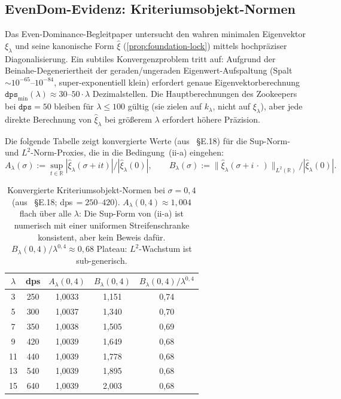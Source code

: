 \documentclass[12pt,a4paper]{article}
\theoremstyle{definition}
\theoremstyle{remark}
\begin{document}
\subsection{EvenDom-Evidenz: Kriteriumsobjekt-Normen}
\label{subsec:evendom-empirics}

Das Even-Dominance-Begleitpaper \cite{Geiger2026evendom} untersucht den
wahren minimalen Eigenvektor $\xi_\lambda$ und seine kanonische Form
$\hat{\xi}$ (\cref{prop:foundation-lock}) mittels hochpräziser
Diagonalisierung. Ein subtiles Konvergenzproblem tritt auf: Aufgrund der
Beinahe-Degeneriertheit der geraden/ungeraden Eigenwert-Aufspaltung
(Spalt $\sim 10^{-65}$--$10^{-84}$, super-exponentiell klein) erfordert
genaue Eigenvektorberechnung $\mathtt{dps}_{\min}(\lambda) \approx 30$--$50
\cdot \lambda$ Dezimalstellen. Die Hauptberechnungen des Zookeepers bei
$\mathtt{dps}=50$ bleiben für $\lambda \le 100$ gültig (sie zielen auf
$k_\lambda$, nicht auf $\xi_\lambda$), aber jede direkte Berechnung von
$\hat{\xi}_\lambda$ bei größerem $\lambda$ erfordert höhere Präzision.

Die folgende Tabelle zeigt konvergierte Werte (aus
\cite{Geiger2026evendom}~§E.18) für die Sup-Norm- und
$L^2$-Norm-Proxies, die in die Bedingung~(ii-a) eingehen:
\begin{equation}
  A_\lambda(\sigma) := \sup_{t\in\mathbb{R}} |\hat{\xi}_\lambda(\sigma+it)|
  / |\hat{\xi}_\lambda(0)|,
  \qquad
  B_\lambda(\sigma) := \|\hat{\xi}_\lambda(\sigma+i\,\cdot\,)\|_{L^2(\mathbb{R})}
  / |\hat{\xi}_\lambda(0)|.
\end{equation}

\begin{table}[h]
\centering
\caption{Konvergierte Kriteriumsobjekt-Normen bei $\sigma=0{,}4$
  (aus \cite{Geiger2026evendom}~§E.18; dps\,$=250$--$420$).
  $A_\lambda(0{,}4)\approx 1{,}004$ flach über alle $\lambda$: Die Sup-Form
  von (ii-a) ist numerisch mit einer uniformen Streifenschranke konsistent,
  aber kein Beweis dafür. $B_\lambda(0{,}4)/\lambda^{0{,}4}
  \approx 0{,}68$ Plateau: $L^2$-Wachstum ist sub-generisch.}
\label{tab:evendom-norms}
\begin{tabular}{ccccc}
\toprule
$\lambda$ & dps & $A_\lambda(0{,}4)$ & $B_\lambda(0{,}4)$ &
  $B_\lambda(0{,}4)/\lambda^{0{,}4}$ \\
\midrule
3  & 250 & 1{,}0033 & 1{,}151 & 0{,}74 \\
5  & 300 & 1{,}0037 & 1{,}340 & 0{,}70 \\
7  & 350 & 1{,}0038 & 1{,}505 & 0{,}69 \\
9  & 420 & 1{,}0039 & 1{,}649 & 0{,}68 \\
11 & 440 & 1{,}0039 & 1{,}778 & 0{,}68 \\
13 & 540 & 1{,}0039 & 1{,}895 & 0{,}68 \\
15 & 640 & 1{,}0039 & 2{,}003 & 0{,}68 \\
\bottomrule
\end{tabular}
\end{table}
\end{document}
